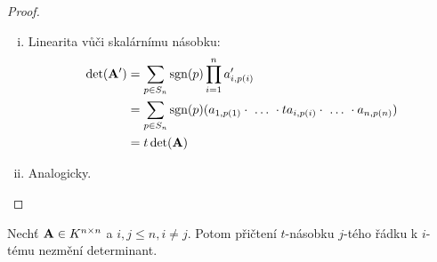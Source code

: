 \begin{proof}
    \leavevmode
    \begin{enumerate}[i.]
        \item Linearita vůči skalárnímu násobku:
            \begin{align*}
                \det(\mathbf{A'}) 
                    &= \sum_{p \in S_n} \mathop{\mathrm{sgn}}(p) \prod_{i=1}^n a'_{i, p(i)} \\
                    &= \sum_{p \in S_n} \mathop{\mathrm{sgn}}(p) (a_{1,p(1)} \cdot ~ \dots ~
                        \cdot ta_{i,p(i)} \cdot ~ \dots ~ \cdot a_{n,p(n)}) \\
                    &= t \det(\mathbf{A})
            \end{align*}
        \item Analogicky.
    \end{enumerate}
\end{proof}

\begin{corollary}
    Nechť $\mathbf{A} \in K^{n\times n}$ a $i,j \leq n, i \neq j$. Potom přičtení 
    $t$-násobku $j$-tého řádku k $i$-tému nezmění determinant.
\end{corollary}


